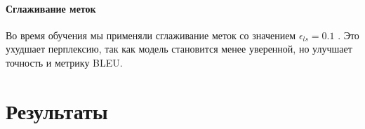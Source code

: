 \documentclass{article}
\begin{document}

\paragraph{Сглаживание меток} Во время обучения мы применяли сглаживание меток со значением $\epsilon_{ls}=0.1$ \citep{DBLP:journals/corr/SzegedyVISW15}. Это ухудшает перплексию, так как модель становится менее уверенной, но улучшает точность и метрику BLEU.

\section{Результаты} \label{sec:results}
\end{document}
